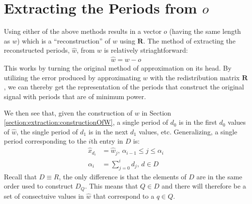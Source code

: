 \section{Extracting the Periods from $o$}
Using either of the above methods results in a vector $o$ (having the same length as $w$) which is a ``reconstruction'' of $w$ using $\bm{R}$. The method of extracting the reconstructed periods, $\hat{w}$, from $w$ is relatively striaghtforward:
\begin{align}
    \hat{w} = w - o
\end{align}
This works by turning the original method of approximation on its head. By utilizing the error produced by approximating $w$ with the redistribution matrix $\bm{R}$, we can thereby get the representation of the periods that construct the original signal with periods that are of minimum power.

We then see that, given the construction of $w$ in Section \ref{section:extraction:constructionOfW}, a single period of $d_0$ is in the first $d_0$ values of $\hat{w}$, the single period of $d_1$ is in the next $d_1$ values, etc. Generalizing, a single period corresponding to the $i$th entry in $D$ is:
\begin{align}
    \hat{x}_{d_i} &= \hat{w}_j \text{, } \alpha_{i-1} \leq j \leq \alpha_{i} \\
    \alpha_i &= \sum_{j = 0}^{i} d_j \text{, } d \in D
\end{align}
Recall that $D \equiv R$, the only difference is that the elements of $D$ are in the same order used to construct $D_{Q}$. This means that $Q \in D$ and there will therefore be a set of consectuive values in $\hat{w}$ that correspond to a $q \in Q$.

